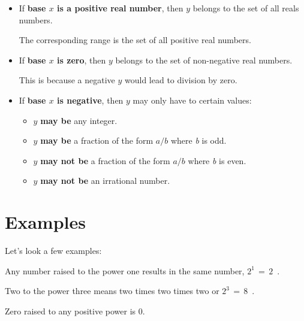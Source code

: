 \documentclass[11pt,a4paper]{report}
\theoremstyle{definition}
\theoremstyle{remark}
\begin{document}
        \begin{itemize}
            \item If \textbf{base $x$ is a positive real number}, then $y$ belongs to the set of all reals numbers.
            
            The corresponding range is the set of all positive real numbers.
            
            \item If \textbf{base $x$ is zero}, then $y$ belongs to the set of non-negative real numbers.
            
            This is because a negative $y$ would lead to division by zero.
            
            \item If \textbf{base $x$ is negative}, then $y$ may only have to certain values:

                    \begin{itemize}
                        \item $y$ \textbf{may be} any integer.
                        
                        \item $y$ \textbf{may be} a fraction of the form $a/b$ where \emph{b} is odd.
                        
                        \item $y$ \textbf{may not be} a fraction of the form $a/b$ where \emph{b} is even.
                        
                        \item $y$ \textbf{may not be} an irrational number. 
                        
                    \end{itemize}
            
        \end{itemize}
        
        \section{Examples}
        Let's look a few examples:
        
        Any number raised to the power one results in the same number, $2^1 \, = \, 2 \,$ .
        
        Two to the power three means two times two times two or $2^3 \, = \, 8 \,$ .
        
        Zero raised to any positive power is 0.
        
\end{document}
